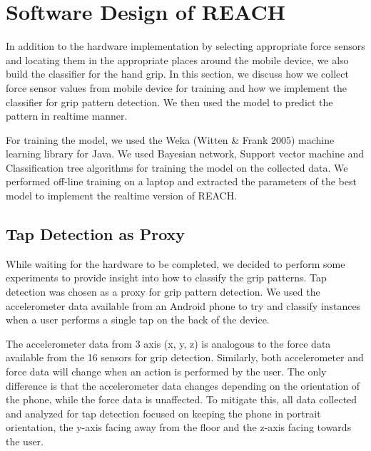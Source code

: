\section{Software Design of REACH}
In addition to the hardware implementation by selecting appropriate force sensors and locating them in the appropriate places around the mobile device, we also build the classifier for the hand grip. In this section, we discuss how we collect force sensor values from mobile device for training and how we implement the classifier for grip pattern detection. We then used the model to predict the pattern in realtime manner.
\par
For training the model,  we used the Weka (Witten \& Frank 2005) machine learning library for Java. We used Bayesian network, Support vector machine and Classification tree algorithms for training the model on the collected data. We performed off-line training on a laptop and extracted the parameters of the best model to implement the realtime version of REACH.

\subsection{Tap Detection as Proxy}
While waiting for the hardware to be completed, we decided to perform some experiments to provide insight into how to  classify the grip patterns. Tap detection was chosen as a proxy for grip pattern detection. We used the accelerometer data available from an Android phone to try and classify instances when a user performs a single tap on the back of the device.
\par
The accelerometer data from 3 axis (x, y, z) is analogous to the force data available from the 16 sensors for grip detection. Similarly, both accelerometer and force data will change when an action is performed by the user. The only difference is that the accelerometer data changes depending on the orientation of the phone, while the force data is unaffected. To mitigate this, all data collected and analyzed for tap detection focused on keeping the phone in portrait orientation, the y-axis facing away from the floor and the z-axis facing towards the user.

